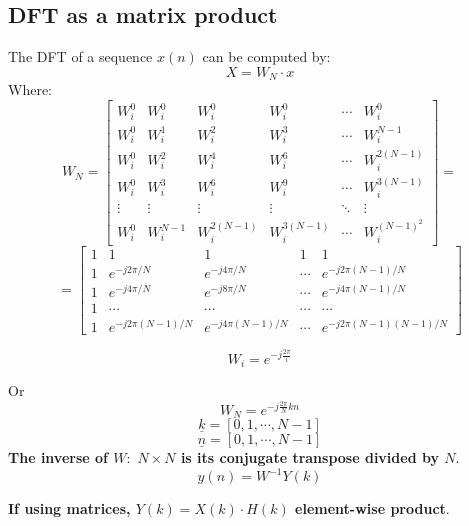 \subsection{DFT as a matrix product}
The DFT of a sequence $x(n)$ can be computed by:
$$X=W_N\cdot x$$
Where:
$$
W_N=
\begin{bmatrix}
    W_i^0 & W_i^0 & W_i^0 & W_i^0 & \cdots & W_i^0\\
    W_i^0 & W_i^1 & W_i^2 & W_i^3 & \cdots & W_i^{N-1}\\
    W_i^0 & W_i^2 & W_i^4 & W_i^6 & \cdots & W_i^{2(N-1)}\\
    W_i^0 & W_i^3 & W_i^6 & W_i^9 & \cdots & W_i^{3(N-1)}\\
    \vdots & \vdots & \vdots & \vdots & \ddots & \vdots\\
    W_i^0 & W_i^{N-1} & W_i^{2(N-1)} & W_i^{3(N-1)} & \cdots & W_i^{(N-1)^2}        
\end{bmatrix}=
$$
$$
=
\begin{bmatrix}
    1 & 1 & 1 & 1 & 1\\
    1 & e^{-j2\pi/N} & e^{-j4\pi/N} & \cdots & e^{-j2\pi(N-1)/N}\\
    1 & e^{-j4\pi/N} & e^{-j8\pi/N} & \cdots & e^{-j4\pi(N-1)/N}\\
    1 & \cdots & \cdots & \cdots & \cdots\\
    1 & e^{-j2\pi(N-1)/N} & e^{-j4\pi(N-1)/N} & \cdots & e^{-j2\pi(N-1)(N-1)/N}
\end{bmatrix}
$$
\begin{LARGE}
    $$W_i=e^{-j\frac{2\pi}{i}}$$
\end{LARGE}
Or
$$
W_N=e^{-j\frac{2\pi}{N}kn}
$$
$$
\underline{k}=\left[0,1,\cdots,N-1\right]
$$
$$
\underline{n}=\left[0,1,\cdots,N-1\right]
$$
\textbf{The inverse of $W:\,\,N\times N$ is its conjugate transpose divided by $N$}.
$$y(n)=W^{-1}Y(k)$$

\textbf{If using matrices, $Y(k)=X(k)\cdot H(k)$ element-wise product}.

